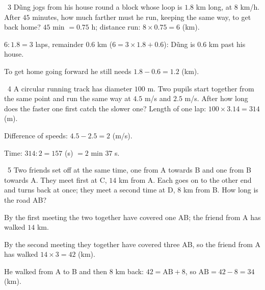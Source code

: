 \gap
\begin{exbox}{\ExWord\ 3}
Dũng jogs from his house round a block whose loop is $1.8$ km long, at $8$ km/h. After $45$ minutes, how much farther must he run, keeping the same way, to get back home?
\guide
$45$ min $=0.75$ h; distance run: $8\times0.75=6$ (km).\par
$6:1.8=3$ laps, remainder $0.6$ km ($6=3\times1.8+0.6$): Dũng is $0.6$ km past his house.\par
To get home going forward he still needs $1.8-0.6=1.2$ (km).
\end{exbox}
\gap
\begin{exbox}{\ExWord\ 4}
A circular running track has diameter $100$ m. Two pupils start together from the same point and run the same way at $4.5$ m/s and $2.5$ m/s. After how long does the faster one first catch the slower one?
\guide
Length of one lap: $100\times3.14=314$ (m).\par
Difference of speeds: $4.5-2.5=2$ (m/s).\par
Time: $314:2=157$ (s) $=2$ min $37$ s.
\end{exbox}
\gap
\begin{exbox}{\ExWord\ 5}
Two friends set off at the same time, one from A towards B and one from B towards A. They meet first at C, $14$ km from A. Each goes on to the other end and turns back at once; they meet a second time at D, $8$ km from B. How long is the road AB?
\guide
\begin{center}
\end{center}
By the first meeting the two together have covered one AB; the friend from A has walked $14$ km.\par
By the second meeting they together have covered three AB, so the friend from A has walked $14\times3=42$ (km).\par
He walked from A to B and then $8$ km back: $42=\text{AB}+8$, so $\text{AB}=42-8=34$ (km).
\end{exbox}
